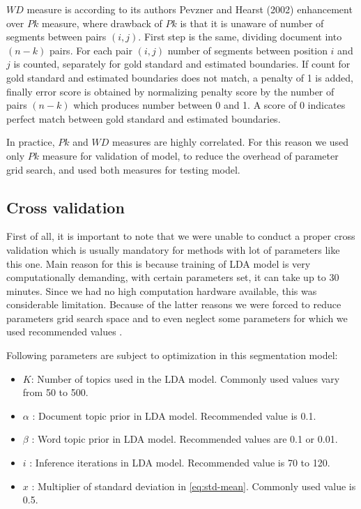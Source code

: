 \documentclass[10pt, a4paper]{article}
\begin{document}
$WD$ measure is according to its authors Pevzner and Hearst (2002) enhancement over $Pk$ measure, where drawback of $Pk$ is that it is unaware of number of segments between pairs $(i,j)$. First step is the same, dividing document into $(n-k)$ pairs. For each pair $(i,j)$ number of segments between position $i$ and $j$ is counted, separately for gold standard and estimated boundaries. If count for gold standard and estimated boundaries does not match, a penalty of 1 is added, finally error score is obtained by normalizing penalty score by the number of pairs $(n-k)$ which produces number between 0 and 1. A score of 0 indicates perfect match between gold standard and estimated boundaries. 

In practice, $Pk$ and $WD$ measures are highly correlated. For this reason we used only $Pk$ measure for validation of model, to reduce the overhead of parameter grid search, and used both measures for testing model. 

\subsection{Cross validation}
First of all, it is important to note that we were unable to conduct a proper cross validation which is usually mandatory for methods with lot of parameters like this one. Main reason for this is because training of LDA model is very computationally demanding, with certain parameters set, it can take up to 30 minutes. Since we had no high computation hardware available, this was considerable limitation. Because of the latter reasons we were forced to reduce parameters grid search space and to even neglect some parameters for which we used recommended values \citep{ref-asistent}.


Following parameters are subject to optimization in this segmentation model:
\begin{itemize}
\item $K$: Number of topics used in the LDA model. Commonly used values vary from 50 to 500.
\item $\alpha$ : Document topic prior in LDA model. Recommended value is 0.1.
\item $\beta$ : Word topic prior in LDA model. Recommended values are 0.1 or 0.01.
\item $i$ : Inference iterations in LDA model. Recommended value is 70 to 120.
\item $x$ : Multiplier of standard deviation in \eqref{eq:std-mean}. Commonly used value is 0.5.
\end{itemize} 
\end{document}
